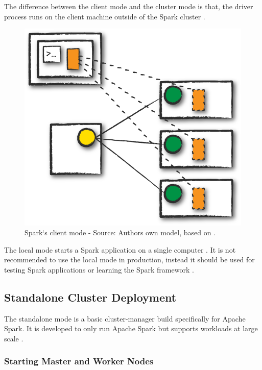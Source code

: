 The difference between the client mode and the cluster mode is that, the driver process runs on the client machine outside of the Spark cluster \cite{Chambers2018Spark}.
\begin{figure}[h]
\centering
\includegraphics[scale=0.5]{images/04_technical_background/client_mode}
\caption{Spark`s client mode - Source: Authors own model, based on \cite{Chambers2018Spark}.}
\label{fig:spark_client_mode}
\end{figure}

The local mode starts a Spark application on a single computer \cite{Chambers2018Spark}. It is not recommended to use the local mode in production, instead it should be used for testing Spark applications or learning the Spark framework \cite{Chambers2018Spark}.


\subsection{Standalone Cluster Deployment}
\label{subsec:04_spark_standalone}
The standalone mode is a basic cluster-manager build specifically for Apache Spark. It is developed to only run Apache Spark but supports workloads at large scale \cite{Chambers2018Spark}.


\subsubsection{Starting Master and Worker Nodes}
